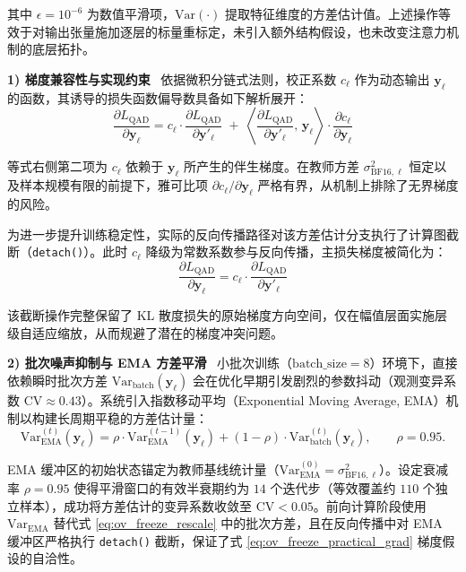 \documentclass[11pt, a4paper]{article}
\begin{document}
其中 $\epsilon=10^{-6}$ 为数值平滑项，$\mathrm{Var}(\cdot)$ 提取特征维度的方差估计值。上述操作等效于对输出张量施加逐层的标量重标定，未引入额外结构假设，也未改变注意力机制的底层拓扑。

\textbf{1) 梯度兼容性与实现约束}
~依据微积分链式法则，校正系数 $c_\ell$ 作为动态输出 $\bm{y}_\ell$ 的函数，其诱导的损失函数偏导数具备如下解析展开：
\begin{equation}
\label{eq:ov_freeze_full_grad}
    \frac{\partial L_{\text{QAD}}}{\partial \bm{y}_\ell}
    =
    c_\ell \cdot \frac{\partial L_{\text{QAD}}}{\partial \bm{y}'_\ell}
    \;+\;
    \left\langle
    \frac{\partial L_{\text{QAD}}}{\partial \bm{y}'_\ell},\, \bm{y}_\ell
    \right\rangle
    \cdot
    \frac{\partial c_\ell}{\partial \bm{y}_\ell}
\end{equation}

等式右侧第二项为 $c_\ell$ 依赖于 $\bm{y}_\ell$ 所产生的伴生梯度。在教师方差 $\sigma^2_{\text{BF16},\ell}$ 恒定以及样本规模有限的前提下，雅可比项 $\partial c_\ell/\partial \bm{y}_\ell$ 严格有界，从机制上排除了无界梯度的风险。

为进一步提升训练稳定性，实际的反向传播路径对该方差估计分支执行了计算图截断（\texttt{detach()}）。此时 $c_\ell$ 降级为常数系数参与反向传播，主损失梯度被简化为：
\begin{equation}
\label{eq:ov_freeze_practical_grad}
    \frac{\partial L_{\text{QAD}}}{\partial \bm{y}_\ell}
    =
    c_\ell \cdot \frac{\partial L_{\text{QAD}}}{\partial \bm{y}'_\ell}
\end{equation}

该截断操作完整保留了 KL 散度损失的原始梯度方向空间，仅在幅值层面实施层级自适应缩放，从而规避了潜在的梯度冲突问题。

\textbf{2) 批次噪声抑制与 EMA 方差平滑}
~小批次训练（$\text{batch\_size}=8$）环境下，直接依赖瞬时批次方差 $\mathrm{Var}_{\text{batch}}(\bm{y}_\ell)$ 会在优化早期引发剧烈的参数抖动（观测变异系数 $\mathrm{CV}\approx 0.43$）。系统引入指数移动平均（Exponential Moving Average, EMA）机制以构建长周期平稳的方差估计量：
\begin{equation}
\label{eq:ov_freeze_ema}
    \mathrm{Var}^{(t)}_{\text{EMA}}(\bm{y}_\ell)
    =
    \rho \cdot \mathrm{Var}^{(t-1)}_{\text{EMA}}(\bm{y}_\ell)
    + (1-\rho)\cdot \mathrm{Var}^{(t)}_{\text{batch}}(\bm{y}_\ell),
    \qquad \rho=0.95.
\end{equation}

EMA 缓冲区的初始状态锚定为教师基线统计量（$\mathrm{Var}^{(0)}_{\text{EMA}}=\sigma^2_{\text{BF16},\ell}$）。设定衰减率 $\rho=0.95$ 使得平滑窗口的有效半衰期约为 $14$ 个迭代步（等效覆盖约 $110$ 个独立样本），成功将方差估计的变异系数收敛至 $\mathrm{CV}<0.05$。前向计算阶段使用 $\mathrm{Var}_{\text{EMA}}$ 替代式 \eqref{eq:ov_freeze_rescale} 中的批次方差，且在反向传播中对 EMA 缓冲区严格执行 \texttt{detach()} 截断，保证了式 \eqref{eq:ov_freeze_practical_grad} 梯度假设的自洽性。
\end{document}
